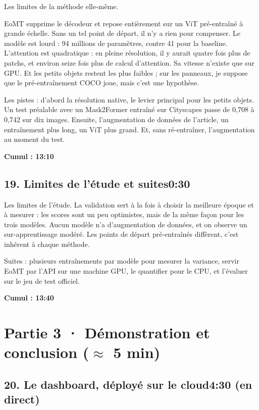 \documentclass[11pt,a4paper]{article}
\newcommand{\cumul}[1]{\par{\hfill\small\color{accent}\bfseries #1}\par}
\newcommand{\tempo}[1]{\hfill{\normalsize\color{accent}#1}}
\begin{document}
Les limites de la méthode elle-même.

EoMT supprime le décodeur et repose entièrement sur un ViT pré-entraîné à grande échelle. Sans un tel point de départ, il n'y a rien pour compenser. Le modèle est lourd : 94 millions de paramètres, contre 41 pour la baseline. L'attention est quadratique : en pleine résolution, il y aurait quatre fois plus de patchs, et environ seize fois plus de calcul d'attention. Sa vitesse n'existe que sur GPU. Et les petits objets restent les plus faibles ; sur les panneaux, je suppose que le pré-entraînement COCO joue, mais c'est une hypothèse.

Les pistes : d'abord la résolution native, le levier principal pour les petits objets. Un test préalable avec un Mask2Former entraîné sur Cityscapes passe de 0,708 à 0,742 sur dix images. Ensuite, l'augmentation de données de l'article, un entraînement plus long, un ViT plus grand. Et, sans ré-entraîner, l'augmentation au moment du test.

\cumul{Cumul : 13:10}

\subsection*{19. Limites de l'étude et suites\tempo{0:30}}

Les limites de l'étude. La validation sert à la fois à choisir la meilleure époque et à mesurer : les scores sont un peu optimistes, mais de la même façon pour les trois modèles. Aucun modèle n'a d'augmentation de données, et on observe un sur-apprentissage modéré. Les points de départ pré-entraînés diffèrent, c'est inhérent à chaque méthode.

Suites : plusieurs entraînements par modèle pour mesurer la variance, servir EoMT par l'API sur une machine GPU, le quantifier pour le CPU, et l'évaluer sur le jeu de test officiel.

\cumul{Cumul : 13:40}

\medskip{\color{linec}\rule{\linewidth}{0.5pt}}\medskip

\section*{Partie 3 · Démonstration et conclusion ($\approx$ 5 min)}

\subsection*{20. Le dashboard, déployé sur le cloud\tempo{4:30 (en direct)}}
\end{document}
